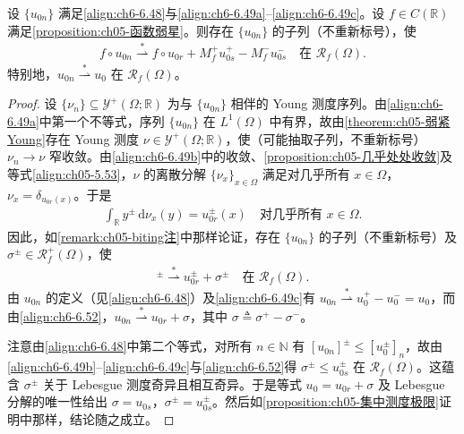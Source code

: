 \documentclass[../../main.tex]{subfiles}%
\begin{document}
\begin{lemma}\label{lemma:ch06-6.5.2}
设 $\{u_{0n}\}$ 满足\eqref{align:ch6-6.48}与\eqref{align:ch6-6.49a}--\eqref{align:ch6-6.49c}。设 $f\in C(\mathbb{R})$ 满足\cref{proposition:ch05-函数弱星}。则存在 $\{u_{0n}\}$ 的子列（不重新标号），使
\begin{align}
f\circ u_{0n}\stackrel{*}{\rightharpoonup}f\circ u_{0r}+M^+_f u^+_{0s}-M^-_f u^-_{0s}
\quad\text{在 }\mathscr{R}_f(\Omega). \label{align:ch6-6.51}
\end{align}
特别地，$u_{0n}\stackrel{*}{\rightharpoonup}u_0$ 在 $\mathscr{R}_f(\Omega)$。
\end{lemma}

\begin{proof}
设 $\{\nu_n\}\subseteq\mathcal{Y}^+(\Omega;\mathbb{R})$ 为与 $\{u_{0n}\}$ 相伴的 Young 测度序列。由\eqref{align:ch6-6.49a}中第一个不等式，序列 $\{u_{0n}\}$ 在 $L^1(\Omega)$ 中有界，故由\cref{theorem:ch05-弱紧Young}存在 Young 测度 $\nu\in\mathcal{Y}^+(\Omega;\mathbb{R})$，使（可能抽取子列，不重新标号）$\nu_n\to\nu$ 窄收敛。由\eqref{align:ch6-6.49b}中的收敛、\cref{proposition:ch05-几乎处处收敛}及等式\eqref{align:ch05-5.53}，$\nu$ 的离散分解 $\{\nu_x\}_{x\in\Omega}$ 满足对几乎所有 $x\in\Omega$，$\nu_x=\delta_{u_{0r}(x)}$。于是
\begin{align*}
\int_\mathbb{R}y^\pm\,\mathrm{d}\nu_x(y)=u^\pm_{0r}(x)
\quad\text{对几乎所有 }x\in\Omega.
\end{align*}
因此，如\cref{remark:ch05-biting注}中那样论证，存在 $\{u_{0n}\}$ 的子列（不重新标号）及 $\sigma^\pm\in\mathscr{R}^+_f(\Omega)$，使
\begin{align}
[u_{0n}]^\pm\stackrel{*}{\rightharpoonup}u^\pm_{0r}+\sigma^\pm \quad\text{在 }\mathscr{R}_f(\Omega). \label{align:ch6-6.52}
\end{align}
由 $u_{0n}$ 的定义（见\eqref{align:ch6-6.48}）及\eqref{align:ch6-6.49c}有 $u_{0n}\stackrel{*}{\rightharpoonup}u^+_0-u^-_0=u_0$，而由\eqref{align:ch6-6.52}，$u_{0n}\stackrel{*}{\rightharpoonup}u_{0r}+\sigma$，其中 $\sigma\triangleq \sigma^+-\sigma^-$。

注意由\eqref{align:ch6-6.48}中第二个等式，对所有 $n\in\mathbb{N}$ 有 $[u_{0n}]^\pm\leqslant[u^\pm_0]_n$，故由\eqref{align:ch6-6.49b}--\eqref{align:ch6-6.49c}与\eqref{align:ch6-6.52}得 $\sigma^\pm\leqslant u^\pm_{0s}$ 在 $\mathscr{R}_f(\Omega)$。这蕴含 $\sigma^\pm$ 关于 Lebesgue 测度奇异且相互奇异。于是等式 $u_0=u_{0r}+\sigma$ 及 Lebesgue 分解的唯一性给出 $\sigma=u_{0s}$，$\sigma^\pm=u^\pm_{0s}$。然后如\cref{proposition:ch05-集中测度极限}证明中那样，结论随之成立。
\end{proof}
\end{document}
